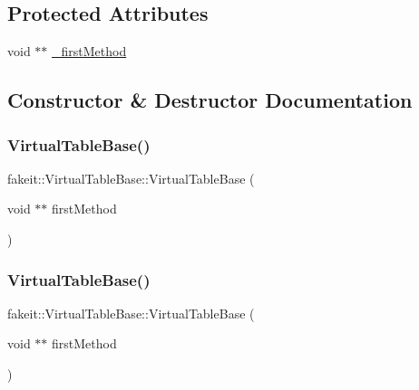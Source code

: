 \subsection*{Protected Attributes}
\begin{DoxyCompactItemize}
\item 
void $\ast$$\ast$ \mbox{\hyperlink{structfakeit_1_1VirtualTableBase_a70f4f1d0ed26a0d09e153d710d379bc4}{\+\_\+first\+Method}}
\end{DoxyCompactItemize}


\subsection{Constructor \& Destructor Documentation}
\mbox{\label{structfakeit_1_1VirtualTableBase_a29219a58bbe09da749b35289469ef886}} 
\subsubsection{\texorpdfstring{VirtualTableBase()}{VirtualTableBase()}\hspace{0.1cm}{\footnotesize\ttfamily [1/10]}}
{\footnotesize\ttfamily fakeit\+::\+Virtual\+Table\+Base\+::\+Virtual\+Table\+Base (\begin{DoxyParamCaption}\item[{void $\ast$$\ast$}]{first\+Method }\end{DoxyParamCaption})\hspace{0.3cm}{\ttfamily [inline]}}

\mbox{\label{structfakeit_1_1VirtualTableBase_a29219a58bbe09da749b35289469ef886}} 
\subsubsection{\texorpdfstring{VirtualTableBase()}{VirtualTableBase()}\hspace{0.1cm}{\footnotesize\ttfamily [2/10]}}
{\footnotesize\ttfamily fakeit\+::\+Virtual\+Table\+Base\+::\+Virtual\+Table\+Base (\begin{DoxyParamCaption}\item[{void $\ast$$\ast$}]{first\+Method }\end{DoxyParamCaption})\hspace{0.3cm}{\ttfamily [inline]}}

